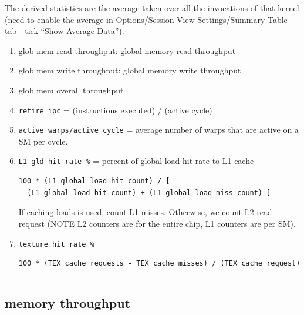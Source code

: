 The derived statistics are the average taken over all the invocations
of that kernel (need to enable the average in Options/Session View
Settings/Summary Table tab - tick ``Show Average Data''). 
\begin{enumerate}
\item glob mem read throughput: global memory read throughput
\item glob mem write throughput: global memory write throughput
\item glob mem overall throughput
\item \verb!retire ipc! = (instructions executed) / (active cycle)
\item \verb!active warps/active cycle! = average number of warps that
  are active on a SM per cycle. 
\item \verb!L1 gld hit rate %! = percent of global load hit rate to
  L1 cache 
\begin{verbatim}
100 * (L1 global load hit count) / [ 
  (L1 global load hit count) + (L1 global load miss count) ]
\end{verbatim}
If caching-loads is used, count L1 misses. Otherwise, we count L2 read
request (NOTE L2 counters are for the entire chip, L1 counters are per
SM). 

\item \verb!texture hit rate %!
\begin{verbatim}
100 * (TEX_cache_requests - TEX_cache_misses) / (TEX_cache_request)
\end{verbatim}
\begin{verbatim}

\end{verbatim}
\end{enumerate}

\subsection{memory throughput}
\label{sec:memory-throughput}

